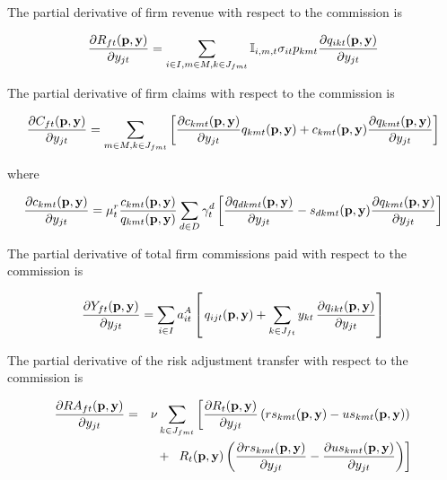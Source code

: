 \documentclass[12pt]{article}
\begin{document}
The partial derivative of firm revenue with respect to the commission is

\begin{equation*}
		\frac{\partial R_{ft}({\bf p},{\bf y})}{\partial y_{jt}} = \sum_{i \in I, m \in M, k \in J_{fmt}} \mathbb{I}_{i,m,t} \sigma_{it} p_{kmt} \frac{\partial q_{ikt}({\bf p},{\bf y})}{\partial y_{jt}}
\end{equation*}

\noindent The partial derivative of firm claims with respect to the commission is

\begin{equation*}
		\frac{\partial C_{ft}({\bf p},{\bf y})}{\partial y_{jt}} = \sum_{m \in M, k \in J_{fmt}}  \left[\frac{\partial c_{kmt}({\bf p},{\bf y})}{\partial y_{jt}} q_{kmt}({\bf p},{\bf y}) + c_{kmt}({\bf p},{\bf y}) \frac{\partial q_{kmt}({\bf p},{\bf y})}{\partial y_{jt}}\right]
\end{equation*}

\noindent where

\begin{equation*}
	\frac{\partial c_{kmt}({\bf p},{\bf y})}{\partial y_{jt}} 
	= \mu_t^r \frac{c_{kmt}({\bf p},{\bf y})}{ q_{kmt}({\bf p},{\bf y})}  \sum_{d \in D} \gamma_t^d \left[\frac{\partial q_{dkmt}({\bf p},{\bf y})}{\partial y_{jt}} - s_{dkmt}({\bf p},{\bf y}) \frac{\partial q_{kmt}({\bf p},{\bf y})}{\partial y_{jt}} \right] 
\end{equation*}

\noindent The partial derivative of total firm commissions paid with respect to the commission is

\begin{equation*}
    \frac{\partial Y_{ft}({\bf p},{\bf y})}{\partial y_{jt}} = \sum_{i \in I} a_{it}^A\left[  \, q_{ijt}({\bf p},{\bf y}) +  \sum_{k \in J_{ft}} y_{kt}  \, \frac{\partial q_{ikt}({\bf p},{\bf y})}{\partial y_{jt}} \right]
\end{equation*}

\noindent The partial derivative of the risk adjustment transfer with respect to the commission is

\begin{footnotesize}
		
		\begin{eqnarray*}
			\frac{\partial RA_{ft}({\bf p},{\bf y})}{\partial y_{jt}} &=& \nu \sum_{k \in J_{fmt}}  \left[\frac{\partial R_t({\bf p},{\bf y})}{\partial  y_{jt}}\left( rs_{kmt}({\bf p},{\bf y}) - us_{kmt}({\bf p},{\bf y})  \right) \right.\\
			&& + \,\,\, \left. R_t({\bf p},{\bf y}) \left( \frac{\partial rs_{kmt}({\bf p},{\bf y})}{\partial  y_{jt}} - \frac{\partial  us_{kmt}({\bf p},{\bf y})}{\partial  y_{jt}} \right) \right]
		\end{eqnarray*}
		
	\end{footnotesize}
\end{document}
